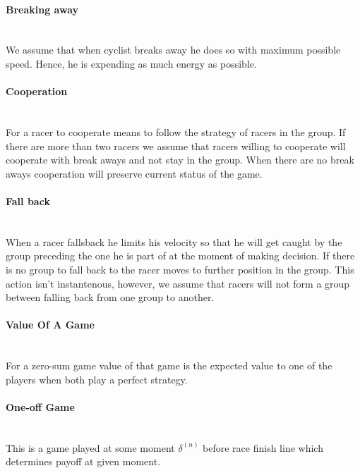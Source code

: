 \documentclass[10pt, a4paper]{report}
\begin{document}
\paragraph{Breaking away} ~\\
We assume that when cyclist breaks away he does so with maximum possible speed. Hence, he is expending as much energy as possible.

\paragraph{Cooperation} ~\\
For a racer to cooperate means to follow the strategy of racers in the group. If there are more than two racers we assume that racers willing to cooperate will cooperate with break aways and not stay in the group. When there are no break aways cooperation will preserve current status of the game.

\paragraph{Fall back} ~\\
When a racer fallsback he limits his velocity so that he will get caught by the group preceding the one he is part of at the moment of making decision. If there is no group to fall back to the racer moves to further position in the group. This action isn't instantenous, however, we assume that racers will not form a group between falling back from one group to another.

\paragraph{Value Of A Game} ~\\
For a zero-sum game value of that game is the expected value to one of the players when both play a perfect strategy.

\paragraph{One-off Game} ~\\
This is a game played at some moment $\delta^{(n)}$ before race finish line which determines payoff at given moment.
\end{document}
